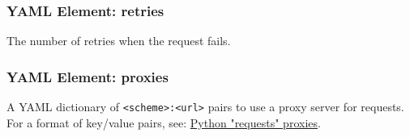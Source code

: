 \subsubsection{YAML Element: retries}\label{sec:yaml-generic-retries}
The number of retries when the request fails.


\subsubsection{YAML Element: proxies}\label{sec:yaml-generic-proxies}
A YAML dictionary of \texttt{<scheme>:<url>} pairs to use a proxy server for requests. 
For a format of key/value pairs, see: \href{https://requests.readthedocs.io/en/latest/user/advanced/\#proxies}{Python "requests" proxies}.




